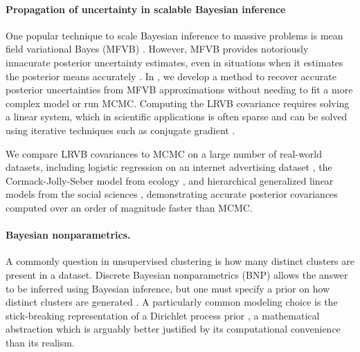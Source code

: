 
\paragraph{Propagation of uncertainty in scalable Bayesian inference}

One popular technique to scale Bayesian inference to massive problems is mean
field variational Bayes (MFVB) \citep{wainwright:2008:graphical,
blei:2017:variational, regier:2019:cataloging}.  However, MFVB provides
notoriously innacurate posterior uncertainty estimates, even in situations when
it estimates the posterior means accurately \citep{turner:2011:two}. In
\citet{giordano:2018:covariances}, we develop a method to recover accurate
posterior uncertainties from MFVB approximations without needing to fit a more
complex model or run MCMC. Computing the LRVB covariance requires solving a
linear system, which in scientific applications is often sparse and can be
solved using iterative techniques such as conjugate gradient \citep[Chapter
5]{nocedal:2006:numerical}.

We compare LRVB covariances to MCMC on a large number of real-world datasets,
including logistic regression on an internet advertising dataset
\citep{criteo:2014:dataset}, the Cormack-Jolly-Seber model from ecology
\citep{kery:2011:bayesian}, and hierarchical generalized linear models from the
social sciences \citep{gelman:2006:arm}, demonstrating accurate posterior
covariances computed over an order of magnitude faster than MCMC.



\paragraph{Bayesian nonparametrics.}

A commonly question in unsupervised clustering is how many distinct clusters are
present in a dataset.  Discrete Bayesian nonparametrics (BNP) allows the answer
to be inferred using Bayesian inference, but one must specify a prior on how
distinct clusters are generated \citep{ghosh:2003:bnp,
gershman:2012:bnptutorial}.  A particularly common modeling choice is the
stick-breaking representation of a Dirichlet process prior
\citep{sethuraman:1994:constructivedp}, a mathematical abstraction which is
arguably better justified by its computational convenience than its realism.

